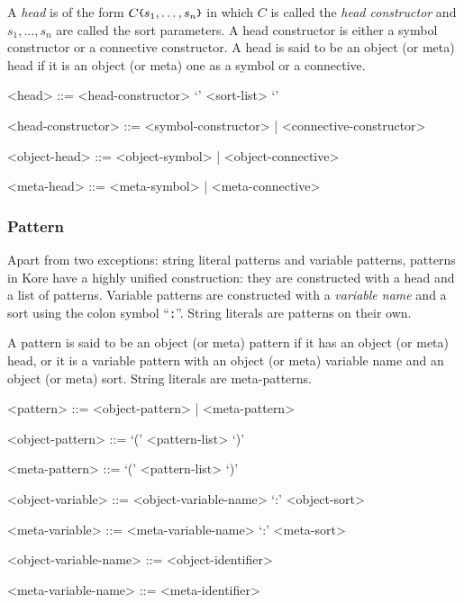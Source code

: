 \documentclass[UTF8,11pt]{article}
\theoremstyle{plain}
\theoremstyle{definition}
\theoremstyle{remark}
\newcommand{\parametric}[2]{{#1}\raisebox{.2ex}{\texttt{\footnotesize{\{}}}#2\raisebox{.2ex}{\texttt{\footnotesize{\}}}}}
\begin{document}
A \emph{head} is of the form $\parametric{C}{s_1,\dots,s_n}$ in which $C$ is 
called the \emph{head constructor} and $s_1,\dots,s_n$ are called the sort 
parameters.
A head constructor is either a symbol constructor or a connective constructor.
A head is said to be an object (or meta) head if it is an object (or meta) one 
as a symbol or a connective.
\begin{grammar}\small
	<head> ::= <head-constructor> `{' <sort-list> `}'
	
	<head-constructor> ::= <symbol-constructor> | <connective-constructor>
	
	<object-head> ::= <object-symbol> | <object-connective>
	
	<meta-head> ::= <meta-symbol> | <meta-connective>
\end{grammar}


\subsubsection{Pattern}
\label{sec:kore-syntax-pattern}
Apart from two exceptions: string literal patterns and variable patterns, 
patterns in Kore have a highly unified construction:
they are constructed with a head and a list of patterns.
Variable patterns are constructed with a \emph{variable name} and a sort using 
the colon symbol ``\texttt{:}''.
String literals are patterns on their own.

A pattern is said to be an object (or meta) pattern if it has an object (or 
meta) head, or it is a variable pattern with an object (or meta) variable name 
and an object (or meta) sort.
String literals are meta-patterns.

\begin{grammar}\small
	<pattern> ::= <object-pattern> | <meta-pattern>
	
	<object-pattern> ::= \quad
	\alt <object-head> `(' <pattern-list> `)'
	
	<meta-pattern> ::= \quad
	\alt <meta-head> `(' <pattern-list> `)'
	\alt <meta-variable>
	\alt <string-literal>
	
	<object-variable> ::= <object-variable-name> `:' <object-sort>
	
	<meta-variable> ::= <meta-variable-name> `:' <meta-sort>
	
	<object-variable-name> ::= <object-identifier>
	
	<meta-variable-name> ::= <meta-identifier>
\end{grammar}
\end{document}
